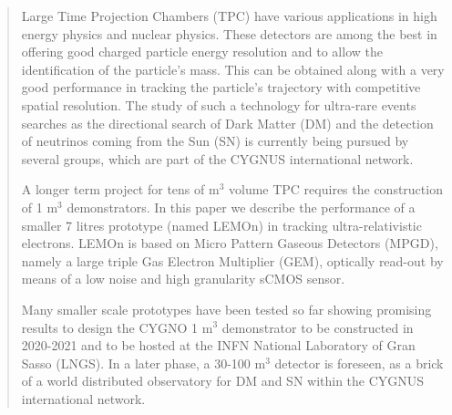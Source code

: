 \documentclass[%
 aip,
 amsmath,amssymb,
 reprint,%
]{revtex4-1}
\begin{document}
\begin{quotation}

Large Time Projection Chambers (TPC)  have various applications in high energy physics and nuclear physics. These detectors are among the best in  offering good charged particle  energy resolution and to allow the identification of the  particle's mass. This can be obtained along with a very good performance in tracking the particle's  trajectory  with competitive spatial resolution.
The study of such a technology for ultra-rare events searches as the directional search of  Dark Matter \cite{Battat:2016xxe, Battat:2016pap, Battat:2014van} (DM) and the detection of neutrinos coming from the Sun (SN) \cite{Seguinot:1992zu, ARPESELLA1996333} is currently being pursued by several groups, which are part of the CYGNUS\cite{CYGNUSweb} international network\cite{baracchini2019cygno}.

  A longer term project for tens of m$^3$ volume TPC requires the construction of 1 m$^3$ demonstrators. In this paper we describe the  performance of a smaller 7 litres prototype (named LEMOn) in tracking ultra-relativistic electrons. LEMOn is based on Micro Pattern Gaseous Detectors (MPGD), namely a large triple Gas Electron Multiplier (GEM)\cite{Sauli:1997qp}, optically read-out by means of a low noise and high granularity sCMOS sensor\cite{ bib:jinst_orange1, bib:nim_orange2}.

Many smaller scale prototypes have been tested so far showing promising results to design the CYGNO 1 m$^3$ demonstrator to be constructed in  2020-2021 and to be hosted at the INFN  National Laboratory of Gran Sasso (LNGS). In a later phase, a 30-100 m$^3$ detector is foreseen, as a brick of a world distributed observatory for DM and SN within the CYGNUS international network.  
\end{quotation}
\end{document}
